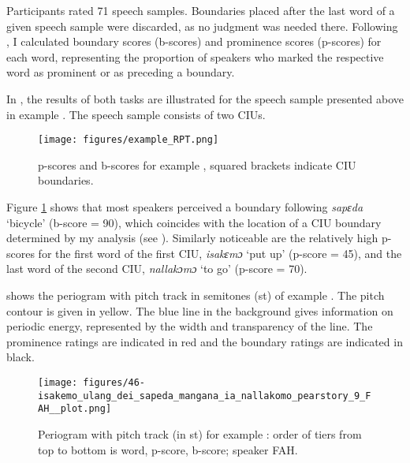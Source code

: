 Participants rated 71 speech samples. Boundaries placed after the last word of a given speech sample were discarded, as no judgment was needed there. Following \citet[304]{cole2010signal}, I calculated boundary scores (b-scores) and prominence scores (p-scores) for each word,  representing the proportion of speakers who marked the respective word as prominent or as preceding a boundary. 

In  , the results of both tasks are illustrated for the speech sample presented above in example  . The speech sample consists of two CIUs.



\begin{figure}
	\texttt{[image: figures/example\_RPT.png]}
	\caption{p-scores and b-scores for example  , squared brackets indicate CIU boundaries.}
	\label{scores example}
\end{figure}

Figure \ref{scores example} shows that most speakers perceived a boundary following \textit{sapɛda} ‘bicycle’ (b-score = 90), which coincides with the location of a CIU boundary determined by my analysis (see  ). Similarly noticeable are the relatively high p-scores for the first word of the first CIU,  \textit{isakɛmɔ} `put up' (p-score = 45), and the last word of the second CIU, \textit{nal​lakɔmɔ} `to go' (p-score = 70). 



 shows the periogram with pitch track in semitones (st) of example  . The pitch contour is given in yellow. The blue line in the background gives information on periodic energy, represented by the width and transparency of the line. The prominence  ratings are indicated in red and the boundary ratings are indicated in black. 

\begin{figure}
	\texttt{[image: figures/46-isakemo\_ulang\_dei\_sapeda\_mangana\_ia\_nallakomo\_pearstory\_9\_FAH\_\_plot.png]}
	\caption{Periogram with pitch track (in st) for example : order of tiers from top to bottom is word, p-score, b-score; speaker FAH.}
	\label{wave form scores example}
\end{figure}


